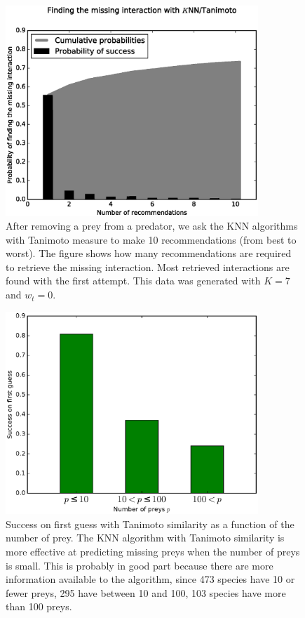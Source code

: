 \documentclass[letterpaper]{article}
\begin{document}
\begin{figure}
  \centering\includegraphics[width=0.85\textwidth]{tanimoto.eps}

  \caption{After removing a prey from a predator, we ask the KNN algorithms
  with Tanimoto measure to make 10 recommendations (from best to worst). The
  figure shows how many recommendations are required to retrieve the missing
  interaction. Most retrieved interactions are found with the first attempt.
  This data was generated with $K = 7$ and $w_t = 0$.}

  \label{fig:tanimoto}
\end{figure}

\begin{figure}
  \centering\includegraphics[width=0.85\textwidth]{tanimoto_n_preys.eps}

  \caption{Success on first guess with Tanimoto similarity as a function of the
  number of prey. The KNN algorithm with Tanimoto similarity is more effective
  at predicting missing preys when the number of preys is small. This is
  probably in good part because there are more information available to the
  algorithm, since 473 species have 10 or fewer preys, 295 have between 10 and
  100, 103 species have more than 100 preys.}

  \label{fig:tanimoto_n_preys}
\end{figure}
\end{document}
